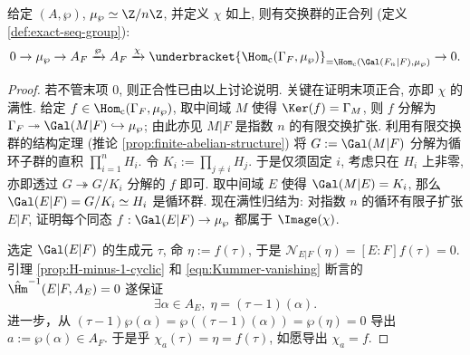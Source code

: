 \begin{theorem}\label{prop:Kummer-isom}
	给定 $(A, \wp)$, $\mu_\wp \simeq \Z/n\Z$, 并定义 $\chi$ 如上, 则有交换群的正合列 (定义 \ref{def:exact-seq-group}):
	\[ 0 \to \mu_\wp \to A_F \xrightarrow{\wp} A_F \xrightarrow{\chi} \underbracket{\Hom_{\text{c}}(\Gamma_F, \mu_\wp)}_{= \Hom_{\text{c}}\left(\Gal(F_n|F), \mu_\wp \right)} \to 0. \]
\end{theorem}
\begin{proof}
	若不管末项 $0$, 则正合性已由以上讨论说明. 关键在证明末项正合, 亦即 $\chi$ 的满性. 给定 $f \in  \Hom_{\text{c}}(\Gamma_F, \mu_\wp)$, 取中间域 $M$ 使得 $\Ker(f) = \Gamma_M$, 则 $f$ 分解为 $\Gamma_F \twoheadrightarrow \Gal(M|F) \hookrightarrow \mu_\wp$; 由此亦见 $M|F$ 是指数 $n$ 的有限交换扩张. 利用有限交换群的结构定理 (推论 \ref{prop:finite-abelian-structure}) 将 $G := \Gal(M|F)$ 分解为循环子群的直积 $\prod_{i=1}^n H_i$. 令 $K_i := \prod_{j \neq i} H_j$. 于是仅须固定 $i$, 考虑只在 $H_i$ 上非零, 亦即透过 $G \twoheadrightarrow G/K_i$ 分解的 $f$ 即可. 取中间域 $E$ 使得 $\Gal(M|E) = K_i$, 那么 $\Gal(E|F) = G/K_i \simeq H_i$ 是循环群. 现在满性归结为: 对指数 $n$ 的循环有限子扩张 $E|F$, 证明每个同态 $f: \Gal(E|F) \to \mu_\wp$ 都属于 $\Image(\chi)$.
	
	选定 $\Gal(E|F)$ 的生成元 $\tau$, 命 $\eta := f(\tau)$, 于是 $\mathcal{N}_{E|F}(\eta) = [E:F]f(\tau) = 0$. 引理 \ref{prop:H-minus-1-cyclic} 和 \eqref{eqn:Kummer-vanishing} 断言的 $\hat{\Hm}^{-1}(E|F, A_E) = 0$ 遂保证
	\[ \exists \alpha \in A_E, \; \eta = \left(\tau - 1 \right)(\alpha). \]
	进一步，从 $(\tau-1) \wp(\alpha) = \wp((\tau-1)(\alpha)) = \wp(\eta) = 0$ 导出 $a := \wp(\alpha) \in A_F$. 于是乎 $\chi_a(\tau) = \eta = f(\tau)$, 如愿导出 $\chi_a = f$.
\end{proof}

